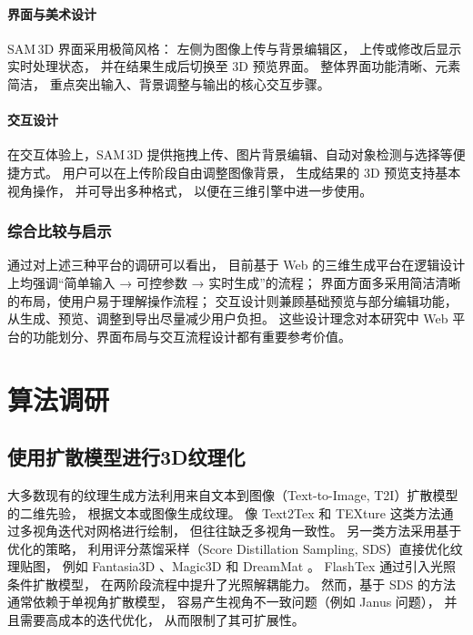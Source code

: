 \paragraph{界面与美术设计}  
SAM 3D 界面采用极简风格：  
左侧为图像上传与背景编辑区，  
上传或修改后显示实时处理状态，  
并在结果生成后切换至 3D 预览界面。  
整体界面功能清晰、元素简洁，  
重点突出输入、背景调整与输出的核心交互步骤。  

\paragraph{交互设计}  
在交互体验上，SAM 3D 提供拖拽上传、图片背景编辑、自动对象检测与选择等便捷方式。  
用户可以在上传阶段自由调整图像背景，  
生成结果的 3D 预览支持基本视角操作，  
并可导出多种格式，  
以便在三维引擎中进一步使用。

\subsubsection{综合比较与启示}

通过对上述三种平台的调研可以看出，  
目前基于 Web 的三维生成平台在逻辑设计上均强调“简单输入 → 可控参数 → 实时生成”的流程；  
界面方面多采用简洁清晰的布局，使用户易于理解操作流程；  
交互设计则兼顾基础预览与部分编辑功能，  
从生成、预览、调整到导出尽量减少用户负担。  
这些设计理念对本研究中 Web 平台的功能划分、界面布局与交互流程设计都有重要参考价值。

\section{算法调研}

\subsection{使用扩散模型进行3D纹理化}

大多数现有的纹理生成方法利用来自文本到图像（Text-to-Image, T2I）扩散模型的二维先验，
根据文本或图像生成纹理。\cite{rombach2022high}
像 Text2Tex \cite{chen2023text2tex} 和 TEXture \cite{richardson2023texture} 这类方法通过多视角迭代对网格进行绘制，
但往往缺乏多视角一致性。
另一类方法采用基于优化的策略，
利用评分蒸馏采样（Score Distillation Sampling, SDS）直接优化纹理贴图，
例如 Fantasia3D \cite{chen2023fantasia3d}、Magic3D \cite{lin2023magic3d} 和 DreamMat \cite{zhang2024dreammat}。
FlashTex \cite{deng2024flashtex} 通过引入光照条件扩散模型，
在两阶段流程中提升了光照解耦能力。
然而，基于 SDS 的方法通常依赖于单视角扩散模型，
容易产生视角不一致问题（例如 Janus 问题），
并且需要高成本的迭代优化，
从而限制了其可扩展性。

